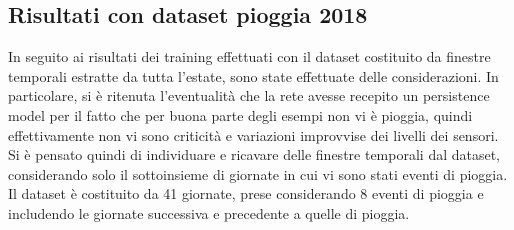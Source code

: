 \subsection{Risultati con dataset pioggia 2018}
In seguito ai risultati dei training effettuati con il dataset costituito da finestre temporali estratte da tutta l’estate, sono state effettuate delle considerazioni. In particolare, si è ritenuta l’eventualità che la rete avesse recepito un persistence model per il fatto che per buona parte degli esempi non vi è pioggia, quindi effettivamente non vi sono criticità e variazioni improvvise dei livelli dei sensori. Si è pensato quindi di individuare e ricavare delle finestre temporali dal dataset, considerando solo il sottoinsieme di giornate in cui vi sono stati eventi di pioggia.
Il dataset è costituito da 41 giornate, prese considerando 8 eventi di pioggia e includendo le giornate successiva e precedente a quelle di pioggia.
